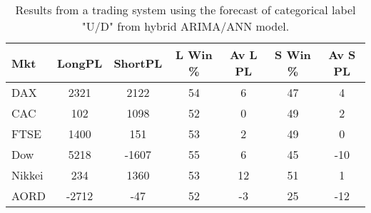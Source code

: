 \begin{table}[ht]
\centering
\caption[Results from a trading system using the forecast of categorical label "U/D" from hybrid ARIMA/ANN model]{Results from a trading system using the forecast of categorical label "U/D" from hybrid ARIMA/ANN model.} 
\label{tab:chp_ts:pUD_CAT_arima_ann_sys}
\begin{tabular}{lcccccc}
  \toprule Mkt & LongPL & ShortPL & L Win \% & Av L PL & S Win \% & Av S PL \\ 
  \midrule DAX & 2321 & 2122 & 54 & 6 & 47 & 4 \\ 
  CAC & 102 & 1098 & 52 & 0 & 49 & 2 \\ 
  FTSE & 1400 & 151 & 53 & 2 & 49 & 0 \\ 
  Dow & 5218 & -1607 & 55 & 6 & 45 & -10 \\ 
  Nikkei & 234 & 1360 & 53 & 12 & 51 & 1 \\ 
  AORD & -2712 & -47 & 52 & -3 & 25 & -12 \\ 
   \bottomrule \end{tabular}
\end{table}
